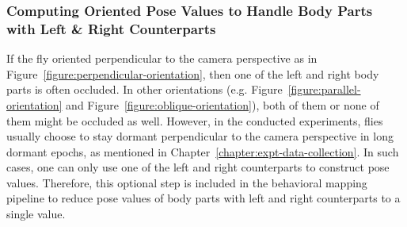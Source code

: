 \subsubsection{Computing Oriented Pose Values to Handle Body Parts with Left \& Right Counterparts}
If the fly oriented perpendicular to the camera perspective as in Figure~\ref{figure:perpendicular-orientation}, then one of the left and right body parts is often occluded.
In other orientations (e.g. Figure~\ref{figure:parallel-orientation} and Figure~\ref{figure:oblique-orientation}),  both of them or none of them might be occluded as well.
However, in the conducted experiments, flies usually choose to stay dormant perpendicular to the camera perspective in long dormant epochs, as mentioned in Chapter~\ref{chapter:expt-data-collection}.
In such cases, one can only use one of the left and right counterparts to construct pose values.
Therefore, this optional step is included in the behavioral mapping pipeline to reduce pose values of body parts with left and right counterparts to a single value.

